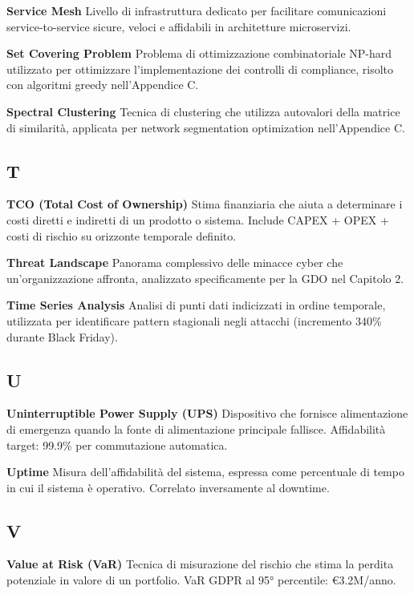 \documentclass{report}
\begin{document}
\textbf{Service Mesh} Livello di infrastruttura dedicato per facilitare
comunicazioni service-to-service sicure, veloci e affidabili in
architetture microservizi.

\textbf{Set Covering Problem} Problema di ottimizzazione combinatoriale
NP-hard utilizzato per ottimizzare l'implementazione dei controlli di
compliance, risolto con algoritmi greedy nell'Appendice C.

\textbf{Spectral Clustering} Tecnica di clustering che utilizza
autovalori della matrice di similarità, applicata per network
segmentation optimization nell'Appendice C.

\subsection{T}\label{t}

\textbf{TCO (Total Cost of Ownership)} Stima finanziaria che aiuta a
determinare i costi diretti e indiretti di un prodotto o sistema.
Include CAPEX + OPEX + costi di rischio su orizzonte temporale definito.

\textbf{Threat Landscape} Panorama complessivo delle minacce cyber che
un'organizzazione affronta, analizzato specificamente per la GDO nel
Capitolo 2.

\textbf{Time Series Analysis} Analisi di punti dati indicizzati in
ordine temporale, utilizzata per identificare pattern stagionali negli
attacchi (incremento 340\% durante Black Friday).

\subsection{U}\label{u}

\textbf{Uninterruptible Power Supply (UPS)} Dispositivo che fornisce
alimentazione di emergenza quando la fonte di alimentazione principale
fallisce. Affidabilità target: 99.9\% per commutazione automatica.

\textbf{Uptime} Misura dell'affidabilità del sistema, espressa come
percentuale di tempo in cui il sistema è operativo. Correlato
inversamente al downtime.

\subsection{V}\label{v}

\textbf{Value at Risk (VaR)} Tecnica di misurazione del rischio che
stima la perdita potenziale in valore di un portfolio. VaR GDPR al 95°
percentile: €3.2M/anno.
\end{document}
